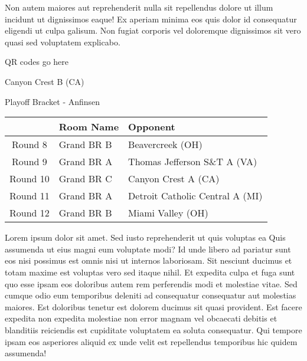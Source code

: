 \documentclass{article}%
\begin{document}
\newline%
Non autem maiores aut reprehenderit nulla sit repellendus dolore ut illum incidunt ut dignissimos eaque! Ex aperiam minima eos quis dolor id consequatur eligendi ut culpa galisum. Non fugiat corporis vel doloremque dignissimos sit vero quasi sed voluptatem explicabo.\newline%
\newline%
%
\vspace*{30pt}%
\begin{center}%
\begin{Huge}%
QR codes go here%
\end{Huge}%
\end{center}%
\newpage%
\begin{center}%
\begin{Huge}%
Canyon Crest B (CA)%
\end{Huge}%
\vspace*{8pt}%
\linebreak%
\begin{Large}%
Playoff Bracket {-} Anfinsen%
\end{Large}%
\end{center}%
\begin{tabularx}{\textwidth}{|c|Y|Y|}%
\hline%
&Room Name&Opponent\\%
\hline%
Round 8&Grand BR B&Beavercreek (OH)\\%
Round 9&Grand BR A&Thomas Jefferson S\&T A (VA)\\%
Round 10&Grand BR C&Canyon Crest A (CA)\\%
Round 11&Grand BR A&Detroit Catholic Central A (MI)\\%
Round 12&Grand BR B&Miami Valley (OH)\\%
\hline%
\end{tabularx}%
\vspace*{8pt}%
\linebreak%
\newline%
\newline%
Lorem ipsum dolor sit amet. Sed iusto reprehenderit ut quis voluptas ea Quis assumenda ut eius magni eum voluptate modi? Id unde libero ad pariatur sunt eos nisi possimus est omnis nisi ut internos laboriosam. Sit nesciunt ducimus et totam maxime est voluptas vero sed itaque nihil. Et expedita culpa et fuga sunt quo esse ipsam eos doloribus autem rem perferendis modi et molestiae vitae.\newline%
\newline%
Sed cumque odio eum temporibus deleniti ad consequatur consequatur aut molestias maiores. Est doloribus tenetur est dolorem ducimus sit quasi provident. Est facere expedita non expedita molestiae non error magnam vel obcaecati debitis et blanditiis reiciendis est cupiditate voluptatem ea soluta consequatur. Qui tempore ipsam eos asperiores aliquid ex unde velit est repellendus temporibus hic quidem assumenda!\newline%
\end{document}
